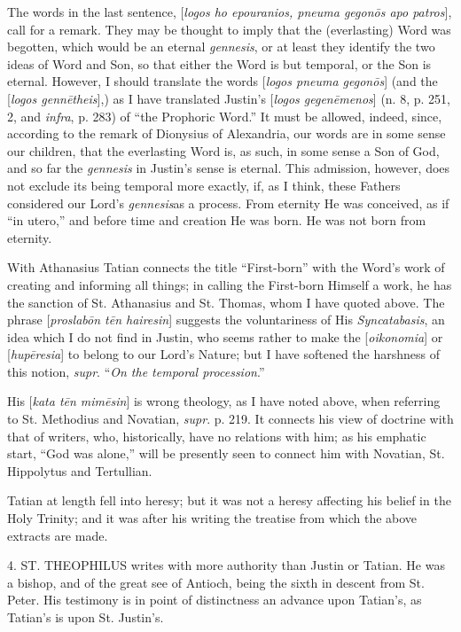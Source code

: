 The words in the last sentence, [\emph{logos ho epouranios, pneuma
gegon\={o}s apo patros}], call for a remark. They may be thought
to imply that the (everlasting) Word was begotten, which would be an
eternal \emph{gennesis}, or at least they identify the two ideas of
Word and Son, so that either the Word is but temporal, or the Son is
eternal. However, I should translate the words [\emph{logos pneuma gegon\={o}s}]
(and the [\emph{logos genn\={e}theis}],) as I have translated
Justin's [\emph{logos gegen\={e}menos}] (n. 8, p. 251, 2, and \emph{infra},
p. 283) of ``the Prophoric Word.'' It must be allowed, indeed,
since, according to the remark of Dionysius of Alexandria, our words
are in some sense our children, that the everlasting Word is, as such,
in some sense a Son of God, and so far the \emph{gennesis} in Justin's
sense is eternal. This admission, however, does not exclude its being
temporal more exactly, if, as I think, these Fathers considered our
Lord's \emph{gennesis}as a process. From eternity He was conceived,
as if ``in utero,'' and before time and creation He was born.
He was not born from eternity.

With Athanasius Tatian connects the title ``First-born''
with the Word's work of creating and informing all things; in calling
the First-born Himself a work, he has the sanction of St. Athanasius
and St. Thomas, whom I have quoted above. The phrase [\emph{proslab\={o}n
t\={e}n hairesin}] suggests the voluntariness of His \emph{Syncatabasis},
an idea which I do not find in Justin, who seems rather to make the [\emph{oikonomia}]
or [\emph{hup\={e}resia}] to belong to our Lord's Nature; but
I have softened the harshness of this notion, \emph{supr}. ``\emph{On
the temporal procession}.''

His [\emph{kata t\={e}n mim\={e}sin}] is wrong theology, as I
have noted above, when referring to St. Methodius and Novatian, \emph{supr}.
p. 219. It connects his view of doctrine with that of writers, who,
historically, have no relations with him; as his emphatic start,
``God was alone,'' will be presently seen to connect him with
Novatian, St. Hippolytus and Tertullian.

Tatian at length fell into heresy; but it was not a heresy
affecting his belief in the Holy Trinity; and it was after his writing
the treatise from which the above extracts are made.

4. ST. THEOPHILUS
writes with more authority than Justin or Tatian. He was a bishop, and
of the great see of Antioch, being the sixth in descent from St.
Peter. His testimony is in point of distinctness an advance upon
Tatian's, as Tatian's is upon St. Justin's.

